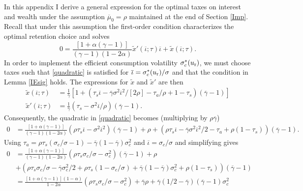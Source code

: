 \documentclass[11pt]{article}
\theoremstyle{plain}
\begin{document}
In this appendix I derive a general expression for the optimal taxes on interest and wealth under the assumption $\overline{\mu}_0 = \rho$ maintained at the end of Section \ref{Imp}. Recall that under this assumption the first-order condition characterizes the optimal retention choice and solves %
$$
0 = \frac{[1 + \alpha(\gamma-1)]}{(\gamma-1)(1 - 2\alpha)}\tilde{x}'(\overline{\iota};\tau)\overline{\iota} + \tilde{x}(\overline{\iota};\tau).
$$
In order to implement the efficient consumption volatility $\sigma_c^*(u_{\textnormal{r}})$, we must choose taxes such that \eqref{quadratic} is satisfied for $\overline{\iota} = \sigma_c^*(u_{\textnormal{r}})/\sigma$ and that the condition in Lemma \ref{IEsig} holds. The expressions for $\tilde{x}$ and $\tilde{x}'$ are then 
\begin{align*}
\tilde{x}(\overline{\iota}; \tau) & = \frac{1}{\overline{\gamma}}{\left[1 + {\left(\tau_s\overline{\iota} - \overline{\gamma}\sigma^2\overline{\iota}^2/[2\rho] -\tau_a/\rho + 1-\tau_s\right)}(\overline{\gamma}-1)\right]}
\\ \tilde{x}'(\overline{\iota}; \tau) & = \frac{1}{\overline{\gamma}}{\left(\tau_s - \sigma^2\overline{\iota}/\rho\right)}(\overline{\gamma}-1).
\end{align*}
Consequently, the quadratic in \eqref{quadratic} becomes (multiplying by $\rho\overline{\gamma}$)
\begin{align*}
0 & = \frac{[1 + \alpha(\gamma-1)]}{(\gamma-1)(1 - 2\alpha)}{\left(\rho \tau_s\overline{\iota} - \sigma^2\overline{\iota}^2\right)}(\overline{\gamma}-1)
 + \rho + {\left(\rho\tau_s\overline{\iota} - \overline{\gamma}\sigma^2\overline{\iota}^2/2 -\tau_a + \rho(1-\tau_s)\right)}(\overline{\gamma}-1).
\end{align*}
Using $\tau_a = \rho\tau_s(\sigma_c/\sigma - 1) - \overline{\gamma}(1-\overline{\gamma}) \sigma_c^2$ and $\overline{\iota} = \sigma_c/\sigma$ and simplifying gives
\begin{align*}
0 & = \frac{[1 + \alpha(\gamma-1)]}{(\gamma-1)(1 - 2\alpha)}{\left(\rho \tau_s \sigma_c/\sigma - \sigma_c^2\right)}(\overline{\gamma}-1) + \rho
\\ & + {\left(\rho\tau_s\sigma_c/\sigma - \overline{\gamma}\sigma_c^2/2 + \rho\tau_s(1-\sigma_c/\sigma) + \overline{\gamma}(1-\overline{\gamma}) \sigma_c^2 + \rho(1-\tau_s)\right)}(\overline{\gamma}-1)
\\ & = \frac{[1 + \alpha(\gamma-1)](1-\alpha)}{1 - 2\alpha}{\left(\rho \tau_s \sigma_c/\sigma - \sigma_c^2\right)} + \overline{\gamma}\rho + \overline{\gamma}(1/2-\overline{\gamma}) (\overline{\gamma}-1) \sigma_c^2
\end{align*}
\end{document}
